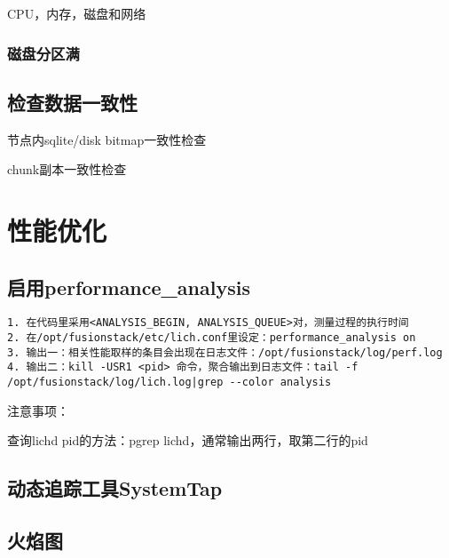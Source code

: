 CPU，内存，磁盘和网络

\subsubsection{磁盘分区满}




\subsection{检查数据一致性}

节点内sqlite/disk bitmap一致性检查

chunk副本一致性检查

\section{性能优化}

\subsection{启用performance\_analysis}

\begin{lstlisting}
1. 在代码里采用<ANALYSIS_BEGIN, ANALYSIS_QUEUE>对，测量过程的执行时间
2. 在/opt/fusionstack/etc/lich.conf里设定：performance_analysis on
3. 输出一：相关性能取样的条目会出现在日志文件：/opt/fusionstack/log/perf.log
4. 输出二：kill -USR1 <pid> 命令，聚合输出到日志文件：tail -f /opt/fusionstack/log/lich.log|grep --color analysis
\end{lstlisting}

注意事项：
\begin{compactenum}
\item 查询lichd pid的方法：pgrep lichd，通常输出两行，取第二行的pid
\end{compactenum}

\subsection{动态追踪工具SystemTap}

\subsection{火焰图}
